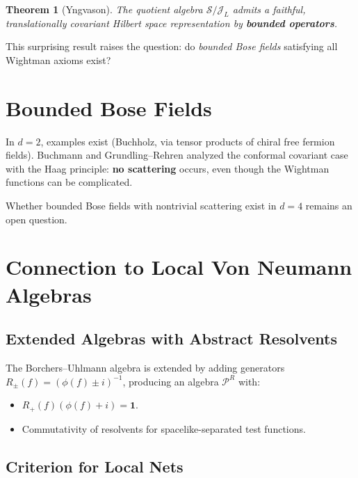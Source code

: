 \documentclass[11pt,a4paper]{article}
\newtheorem{theorem}{Theorem}[section]
\begin{document}
\begin{theorem}[Yngvason]
The quotient algebra $\mathcal{S}/\mathcal{J}_L$ admits a faithful,
translationally covariant Hilbert space representation by
\textbf{bounded operators}.
\end{theorem}

This surprising result raises the question: do \emph{bounded Bose fields}
satisfying all Wightman axioms exist?

\section{Bounded Bose Fields}

In $d=2$, examples exist (Buchholz, via tensor products of chiral
free fermion fields). Buchmann and Grundling--Rehren analyzed the
conformal covariant case with the Haag principle: \textbf{no scattering}
occurs, even though the Wightman functions can be complicated.

Whether bounded Bose fields with nontrivial scattering exist in $d=4$
remains an open question.

\section{Connection to Local Von Neumann Algebras}

\subsection{Extended Algebras with Abstract Resolvents}

The Borchers--Uhlmann algebra is extended by adding generators
$R_\pm(f) = (\phi(f) \pm i)^{-1}$, producing an algebra $\mathcal{P}^R$
with:
\begin{itemize}[nosep]
  \item $R_+(f)(\phi(f) + i) = \mathbf{1}$.
  \item Commutativity of resolvents for spacelike-separated test functions.
\end{itemize}

\subsection{Criterion for Local Nets}
\end{document}
